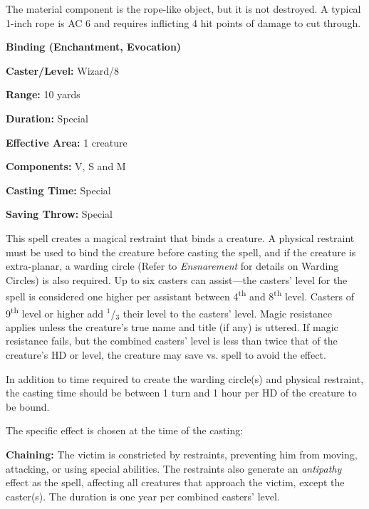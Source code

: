 \begin{multicols}{2}
The material component is the rope-like object, but it is not destroyed.  A typical 1-inch rope is AC 6 and requires inflicting 4 hit points of damage to cut through.

\vspace{1em}

\noindent
\begin{minipage}{\columnwidth}

\noindent \textbf{Binding (Enchantment, Evocation)}

\noindent \textbf{Caster/Level:} Wizard/8

\noindent \textbf{Range:} 10 yards

\noindent \textbf{Duration:} Special

\noindent \textbf{Effective Area:} 1 creature

\noindent \textbf{Components:} V, S and M

\noindent \textbf{Casting Time:} Special

\noindent \textbf{Saving Throw:} Special

\end{minipage}

This spell creates a magical restraint that binds a creature.  A physical restraint must be used to bind the creature before casting the spell, and if the creature is extra-planar, a warding circle (Refer to \textit{Ensnarement} for details on Warding Circles) is also required.  Up to six casters can assist---the casters' level for the spell is considered one higher per assistant between 4\textsuperscript{th} and 8\textsuperscript{th} level.  Casters of 9\textsuperscript{th} level or higher add $^1$/$_3$ their level to the casters' level.  Magic resistance applies unless the creature's true name and title (if any) is uttered.  If magic resistance fails, but the combined casters' level is less than twice that of the creature's HD or level, the creature may save vs. spell to avoid the effect.  

In addition to time required to create the warding circle(s) and physical restraint, the casting time should be between 1 turn and 1 hour per HD of the creature to be bound.

The specific effect is chosen at the time of the casting:

\textbf{Chaining:} The victim is constricted by restraints, preventing him from moving, attacking, or using special abilities.  The restraints also generate an \textit{antipathy} effect as the spell, affecting all creatures that approach the victim, except the caster(s).  The duration is one year per combined casters' level.  


\end{multicols}

